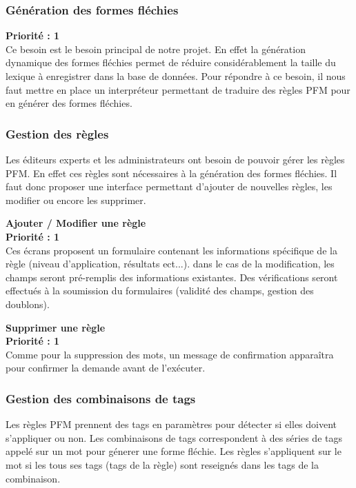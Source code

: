 \documentclass[12pt,a4paper]{article}
\begin{document}
\subsubsection{Génération des formes fléchies}
\textbf{Priorité : 1} \\
Ce besoin est le besoin principal de notre projet. En effet la génération dynamique des formes fléchies permet de réduire considérablement la taille du lexique à enregistrer dans la base de données.
Pour répondre à ce besoin, il nous faut mettre en place un interpréteur permettant de traduire des règles PFM pour en générer des formes fléchies.

\subsubsection{Gestion des règles} 

Les éditeurs experts et les administrateurs ont besoin de pouvoir gérer les règles PFM. En effet ces règles sont nécessaires à la génération des formes fléchies. Il faut donc proposer une interface permettant d'ajouter de nouvelles règles, les modifier ou encore les supprimer.

\textbf{Ajouter / Modifier une règle}  \\ 
\textbf{Priorité : 1} \\
Ces écrans proposent un formulaire contenant les informations spécifique de la règle (niveau d'application, résultats ect...). dans le cas de la modification, les champs seront pré-remplis des informations existantes.
Des vérifications seront effectués à la soumission du formulaires (validité des champs, gestion des doublons).

\textbf{Supprimer une règle}  \\ 
\textbf{Priorité : 1} \\
Comme pour la suppression des mots, un message de confirmation apparaîtra pour confirmer la demande avant de l'exécuter.

\subsubsection{Gestion des combinaisons de tags}

Les règles PFM prennent des tags en paramètres pour détecter si elles doivent s'appliquer ou non.
Les combinaisons de tags correspondent à des séries de tags appelé sur un mot pour génerer une forme fléchie. 
Les règles s'appliquent sur le mot si les tous ses tags (tags de la règle) sont reseignés dans les tags de la combinaison.
\end{document}

